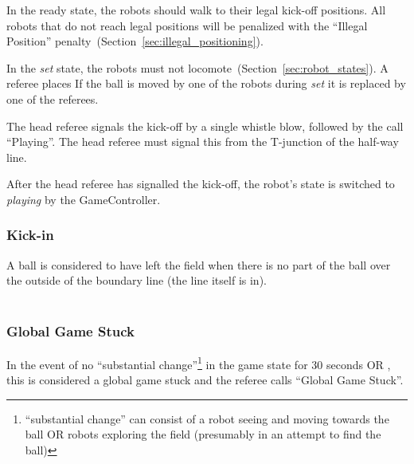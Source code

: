 In the ready state, the robots should walk to their legal kick-off positions.
All robots that do not reach legal positions will be penalized with the ``Illegal Position'' penalty~(\cf Section~\ref{sec:illegal_positioning}).

In the \emph{set} state, the robots must not locomote~(\cf Section~\ref{sec:robot_states}). A referee places 
If the ball is moved by one of the robots during \emph{set} it is replaced by one of the referees.


The head referee signals the kick-off by a single whistle blow, followed by the call ``Playing''. The head referee must signal this from the T-junction of the half-way line.

After the head referee has signalled the kick-off, the robot's state is switched to \emph{playing} by the GameController.

\subsubsection{Kick-in}
\label{sec:kick_in}

A ball is considered to have left the field when there is no part of the ball over the outside of the boundary line (\ie the line itself is in). \\
 \\

\subsubsection{Global Game Stuck}
\label{sec:game_stuck:global}

In the event of no ``substantial change''\footnote{``substantial change'' can consist of a robot seeing and moving towards the ball OR robots exploring the field (presumably in an attempt to find the ball)} in the game state for 30 seconds OR , this is considered a global game stuck and the referee calls ``Global Game Stuck''. 

